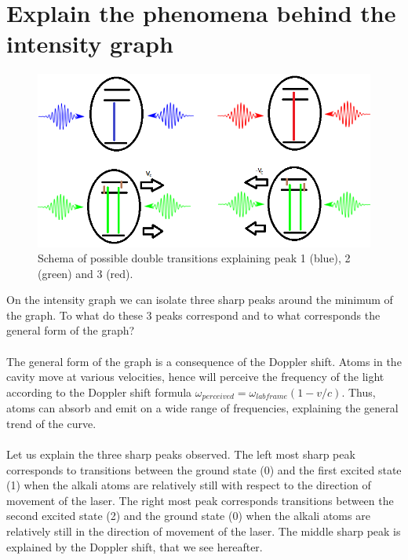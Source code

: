 \documentclass[10pt,a4paper]{article}
\begin{document}
\section{Explain the phenomena behind the intensity graph}
\begin{figure}[h!]
    \centering
    \includegraphics[width = \textwidth]{DopplerTransitions.png}
    \caption{Schema of possible double transitions explaining peak 1 (blue), 2 (green) and 3 (red).}
\end{figure}
On the intensity graph we can isolate three sharp peaks around the minimum of the graph. To what do these 3 peaks correspond and to what corresponds the general form of the graph? \\ \\ The general form of the graph is a consequence of the Doppler shift. Atoms in the cavity move at various velocities, hence will perceive the frequency of the light according to the Doppler shift formula $\omega_{perceived} = \omega _{lab frame} (1-v/c)$. Thus, atoms can absorb and emit on a wide range of frequencies, explaining the general trend of the curve. \\ \\
Let us explain the three sharp peaks observed. The left most sharp peak corresponds to transitions between the ground state (0) and the first excited state (1) when the alkali atoms are relatively still with respect to the direction of movement of the laser. The right most peak corresponds transitions between the second excited state (2) and the ground state (0) when the alkali atoms are relatively still in the direction of movement of the laser. The middle sharp peak is explained by the Doppler shift, that we see hereafter. \\ \\
\end{document}
